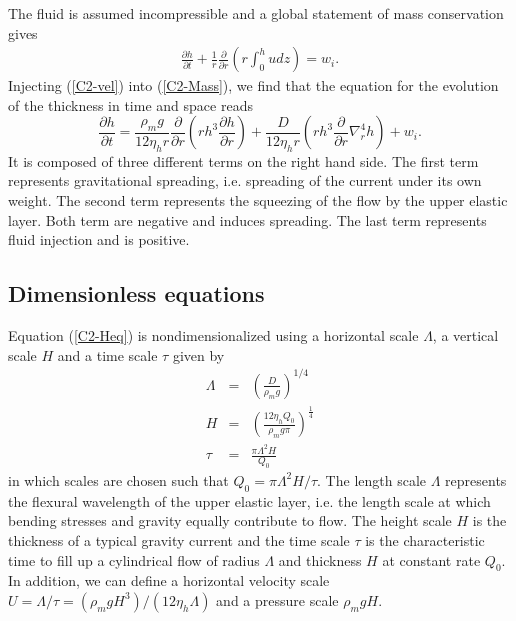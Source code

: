 The fluid  is assumed  incompressible and a  global statement  of mass
conservation gives
\begin{eqnarray}
  \frac{\partial         h}{\partial        t} +\frac{1}{r}
  \frac{\partial}{\partial
  r} \left( r\int_0^hudz\right) = w_i.
  \label{C2-Mass}
\end{eqnarray}
Injecting  (\ref{C2-vel})  into  (\ref{C2-Mass}),  we  find  that  the
equation for the evolution of the thickness in time and space reads
\begin{equation}
  \frac{\partial h}{\partial t} =\frac{\rho_mg}{12 \eta_h r}
  \frac{\partial}{\partial r}  \left( rh^3  \frac{\partial h}{\partial
      r}\right)+\frac{D}{12\eta_h r} \left( rh^3 \frac{\partial}{\partial r}\nabla_r^4h\right)+
  w_i .\label{C2-Heq}
\end{equation}
It is  composed of three different  terms on the right  hand side. The
first term represents gravitational  spreading, i.e.  spreading of the
current under its own weight. The second term represents the squeezing
of the  flow by the upper  elastic layer.  Both term  are negative and
induces spreading.   The last term  represents fluid injection  and is
positive.

\subsection{Dimensionless equations}
\label{C2-sec:dimens-equat}

Equation (\ref{C2-Heq}) is nondimensionalized using a horizontal scale
$\Lambda$, a vertical scale $H$ and a time scale $\tau$ given by
\begin{eqnarray}
  \Lambda &=& \left(\frac{D}{\rho_m g}\right)^{1/4}\label{C2-L1}\\
  H&=&\left       (\frac{12\eta_h      Q_{0}}{\rho_{m}g       \pi}\right      )
       ^{\frac{1}{4}} \label{C2-H1}\\
  \tau&=&\frac{\pi \Lambda^{2} H}{Q_{0}}\label{C2-T1}
\end{eqnarray}
in which scales are chosen such  that $Q_0 = \pi\Lambda^2 H/\tau$. The
length scale $\Lambda$ represents the flexural wavelength of the upper
elastic layer,  i.e. the  length scale at  which bending  stresses and
gravity  equally contribute  to flow.   The  height scale  $H$ is  the
thickness of  a typical gravity current  and the time scale  $\tau$ is
the  characteristic time  to  fill  up a  cylindrical  flow of  radius
$\Lambda$ and thickness  $H$ at constant rate $Q_0$.   In addition, we
can       define        a       horizontal        velocity       scale
$U=\Lambda/\tau=\left(\rho_m           g           H^3\right)/\left(12
  \eta_h\Lambda\right)$ and a pressure scale $\rho_m g H$.

